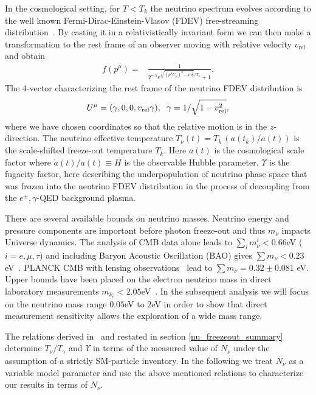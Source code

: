 In the cosmological setting, for $T<T_k$ the neutrino spectrum evolves according to the well known Fermi-Dirac-Einstein-Vlasov (FDEV) free-streaming  distribution~\cite{Langacker:1982,bruhat,Wong,Birrell:2013_2}.  By casting it in a relativistically invariant form we can then make a transformation to the rest frame of an observer moving with relative velocity $v_{\text{rel}}$ and obtain
\begin{align}\label{neutrino_dist}
f(p^\mu)=&\frac{1}{\Upsilon^{-1} e^{\sqrt{(p^\mu U_\mu)^2-m_\nu^2}/T_\nu}+1}.
\end{align}
The 4-vector characterizing the rest frame of the neutrino FDEV distribution is
\begin{equation}\label{4_vel}
U^\mu=(\gamma,0,0,v_{\text{rel}}\gamma),\hspace{2mm} \gamma={1}/{\sqrt{1-v_{\text{rel}}^2}},
\end{equation} 
where we have chosen coordinates so that the relative motion is in the $z$-direction. The neutrino effective temperature $T_\nu(t)= T_k\,(a(t_k)/a(t))$ is the scale-shifted freeze-out temperature $T_k$. Here $a(t)$ is the cosmological scale factor where $\dot a(t)/a(t)\equiv H$ is the observable Hubble parameter. $\Upsilon$ is the  fugacity factor, here describing the underpopulation of neutrino phase space that was frozen into the neutrino FDEV distribution in the process of decoupling from the $e^\pm,\gamma$-QED background  plasma.

There are several available bounds on neutrino masses. Neutrino energy and pressure components are important before photon freeze-out and thus $m_\nu$ impacts Universe dynamics. The analysis of CMB data alone leads to $\sum_i m_\nu^i<0.66$eV ($i=e,\mu,\tau$) and including Baryon Acoustic Oscillation (BAO) gives $\sum m_\nu<0.23$eV~\cite{Planck}.  {\small PLANCK CMB} with lensing observations~\cite{Battye:2013xqa} lead to  $\sum m_{\nu}=0.32\pm0.081$ eV. Upper bounds have been placed on the electron neutrino mass in direct laboratory measurements  $m_{\bar\nu_e}<2.05$eV~\cite{Beringer:1900zz,Aseev}.   In the subsequent analysis we will focus on the neutrino mass range $0.05$eV to $2$eV in order to show that direct measurement sensitivity allows the exploration of a wide mass range. 



 The relations derived in~\cite{Birrell:2013_2} and restated in section \ref{nu_freezeout_summary} determine $T_\nu/T_\gamma$ and  $\Upsilon$ in terms of the measured  value of  $N_\nu$ under the assumption of a strictly SM-particle inventory.  In the following we treat $N_\nu$  as a variable model parameter and use the above mentioned relations to characterize our results in terms of $N_\nu$.


